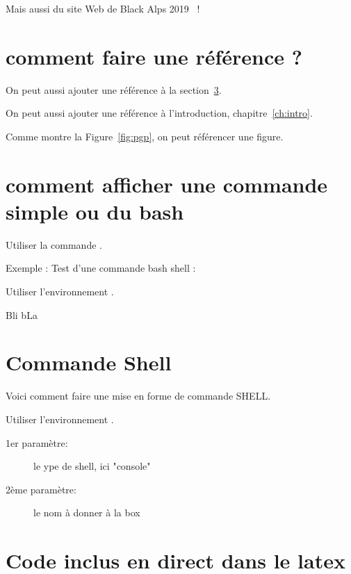 Mais aussi du site Web de Black Alps 2019~\cite{BA19} !


\section{comment faire une référence ?}

On peut aussi ajouter une référence à la section~\ref{sec:shell}.

On peut aussi ajouter une référence à l'introduction, chapitre~\ref{ch:intro}.

Comme montre la Figure~\ref{fig:pgp}, on peut référencer une figure.


\section{comment afficher une commande simple ou du bash}

Utiliser la commande .

Exemple : Test d'une commande bash shell  : 

Utiliser l'environnement .

Bli bLa


\section{Commande Shell}
\label{sec:shell}

Voici comment faire une mise en forme de commande SHELL.

Utiliser l'environnement .
\begin{description}
 \item[1er paramètre:] le ype de shell, ici "console"
 \item[2ème paramètre:] le nom à donner à la box
\end{description}



\section{Code inclus en direct dans le latex}

